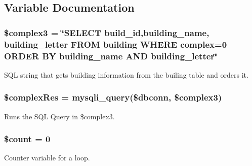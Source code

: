 \subsection{\-Variable \-Documentation}
\hypertarget{editBuilding_8php_a6f8a1bc2bbda3a3b8f381cc7b0b5f2fb}{
\subsubsection[{\$complex3}]{\setlength{\rightskip}{0pt plus 5cm}\$complex3 = \char`\"{}\-S\-E\-L\-E\-C\-T build\-\_\-id,building\-\_\-name, building\-\_\-letter \-F\-R\-O\-M building \-W\-H\-E\-R\-E complex=0 \-O\-R\-D\-E\-R \-B\-Y building\-\_\-name \-A\-N\-D building\-\_\-letter\char`\"{}}}\label{editBuilding_8php_a6f8a1bc2bbda3a3b8f381cc7b0b5f2fb}
\-S\-Q\-L string that gets building information from the builing table and orders it. \hypertarget{editBuilding_8php_a8e5989179b69fda571d827939d1933d4}{
\subsubsection[{\$complex\-Res}]{\setlength{\rightskip}{0pt plus 5cm}\$complex\-Res = mysqli\-\_\-query(\$dbconn, \$complex3)}}\label{editBuilding_8php_a8e5989179b69fda571d827939d1933d4}
\-Runs the \-S\-Q\-L \-Query in \$complex3. \hypertarget{editBuilding_8php_af789423037bbc89dc7c850e761177570}{
\subsubsection[{\$count}]{\setlength{\rightskip}{0pt plus 5cm}\$count = 0}}\label{editBuilding_8php_af789423037bbc89dc7c850e761177570}
\-Counter variable for a loop. 